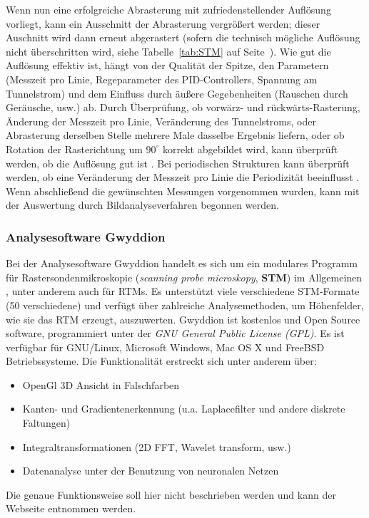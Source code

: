 Wenn nun eine erfolgreiche Abrasterung mit zufriedenstellender
Auflösung vorliegt, kann ein Ausschnitt der Abrasterung
vergrößert werden; dieser Auschnitt wird dann erneut abgerastert
(sofern die technisch mögliche Auflösung nicht überschritten wird,
siehe Tabelle~\ref{tab:STM} auf Seite~\pageref{tab:STM}).
Wie gut die Auflösung effektiv ist, hängt von der Qualität der 
Spitze, den Parametern (Messzeit pro Linie, Regeparameter des
PID-Controllers, Spannung am Tunnelstrom) und dem Einfluss durch
äußere Gegebenheiten (Rauschen durch Geräusche, usw.) ab. 
Durch Überprüfung, ob vorwärz- und rückwärts-Rasterung,
Änderung der Messzeit pro Linie, Veränderung des Tunnelstroms,
oder Abrasterung derselben Stelle mehrere Male  
dasselbe Ergebnis liefern, oder ob Rotation der Rasterichtung
um $90^{\circ}$ korrekt abgebildet wird, kann überprüft werden,
ob die Auflösung gut ist \cite{versuchsanleitung}.
Bei periodischen Strukturen kann überprüft werden, ob eine
Veränderung der Messzeit pro Linie die Periodizität beeinflusst
\cite{versuchsanleitung}. Wenn abschließend die gewünschten
Messungen vorgenommen wurden, kann mit der Auswertung 
durch Bildanalyseverfahren begonnen werden. 
\subsubsection{Analysesoftware Gwyddion}
Bei der Analysesoftware Gwyddion handelt es sich um ein modulares
Programm für Rastersondenmikroskopie (\textit{scanning probe
microskopy}, \textbf{STM}) 
im Allgemeinen \cite{gwyddion}, unter anderem auch für RTMs.
Es unterstützt viele verschiedene STM-Formate (50 verschiedene)
und verfügt über zahlreiche Analysemethoden, 
um Höhenfelder, wie sie das RTM erzeugt,
auszuwerten. Gwyddion ist kostenlos und Open Source software,
programmiert unter der \textit{GNU General Public License (GPL)}.
Es ist verfügbar für GNU/Linux, Microsoft Windows, Mac OS X und
FreeBSD Betriebssysteme\cite{gwyddion}.
Die Funktionalität erstreckt sich unter anderem über:
\begin{itemize}
    \item OpenGl 3D Ansicht in Falschfarben
    \item Kanten- und Gradientenerkennung (u.a. Laplacefilter und andere diskrete Faltungen)
    \item Integraltransformationen (2D FFT, Wavelet transform, usw.)
    \item Datenanalyse unter der Benutzung von neuronalen Netzen
\end{itemize}
Die genaue Funktionsweise soll hier nicht beschrieben werden
und kann der Webseite\cite{gwyddion} entnommen werden.


